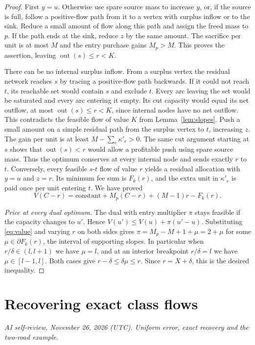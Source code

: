 \documentclass[11pt,oneside,openany,notitlepage]{report}
\newcommand{\reviewdate}{November 26, 2026 (UTC)}
\newcommand{\reviewmark}[1]{\par\nopagebreak[4]\noindent
  {\footnotesize\itshape AI self-review, \reviewdate. #1\par}\nobreak\smallskip}
\begin{document}
\begin{proof}
First \(y=u\). Otherwise use spare source mass to increase \(y\), or, if
the source is full, follow a positive-flow path from it to a vertex with
surplus inflow or to the sink. Reduce a small amount of flow along this
path and assign the freed mass to \(p\). If the path ends at the sink,
reduce \(z\) by the same amount. The sacrifice per unit is at most \(M\)
and the entry purchase gains \(M_p>M\). This proves the assertion, leaving
\(\operatorname{out}(s)\le r<K\).

There can be no internal surplus inflow. From a surplus vertex the residual
network reaches \(s\) by tracing a positive-flow path backwards. If it could
not reach \(t\), its reachable set would contain \(s\) and exclude \(t\).
Every arc leaving the set would be saturated and every arc entering it
empty. Its cut capacity would equal its net outflow, at most
\(\operatorname{out}(s)\le r<K\), since internal nodes have no net outflow.
This contradicts the feasible flow of value \(K\) from Lemma~\ref{lem:slopes}.
Push a small amount on a simple residual path from the surplus vertex to
\(t\), increasing \(z\). The gain per unit is at least
\(M-\sum_e\kappa'_e>0\). The same cut argument starting at \(s\) shows
that \(\operatorname{out}(s)<r\) would allow a profitable push using spare
source mass. Thus the optimum conserves at every internal node and sends
exactly \(r\) to \(t\). Conversely, every feasible \(s\)-\(t\) flow of
value \(r\) yields a residual allocation with \(y=u\) and \(z=r\).
Its minimum fee sum is \(F_k(r)\), and the extra unit in \(\kappa'_e\)
is paid once per unit entering \(t\). We have proved
\begin{equation}\label{eq:value}
 V(C-r)=\mathrm{constant}+M_p(C-r)+(M-1)r-F_k(r).
\end{equation}

\emph{Price at every dual optimum.}
The dual with entry multiplier \(\pi\) stays feasible if the capacity
changes to \(u'\). Hence \(V(u')\le V(u)+\pi(u'-u)\). Substituting
\eqref{eq:value} and varying \(r\) on both sides gives
\(\pi=M_p-M+1+\mu=2+\mu\) for some \(\mu\in\partial F_k(r)\), the interval
of supporting slopes. In particular when \(r/\delta\in(l,l+1)\) we have
\(\mu=l\), and at an interior breakpoint \(r/\delta=l\) we have
\(\mu\in[l-1,l]\). Both cases give \(r-\delta\le\delta\mu\le r\).
Since \(r=X+\delta\), this is the desired inequality.
\end{proof}

\section{Recovering exact class flows}
\reviewmark{Uniform error, exact recovery and the two-road example.}
\end{document}
